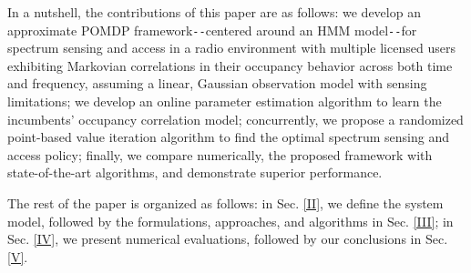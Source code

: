 \documentclass[10pt,twocolumn]{IEEEtran}
\begin{document}
 In a nutshell, the contributions of this paper are as follows:
we develop an approximate POMDP framework\texttt{-{}-}centered around an HMM model\texttt{-{}-}for spectrum sensing and access in a radio environment with multiple licensed users exhibiting Markovian correlations in their occupancy behavior across both time and frequency, assuming a linear, Gaussian observation model with sensing limitations; we develop an online parameter estimation algorithm to learn the incumbents' occupancy correlation model; concurrently, we propose a randomized point-based value iteration algorithm to find the optimal spectrum sensing and access policy; finally, we compare numerically, the proposed framework with state-of-the-art algorithms, and demonstrate superior performance. 

The rest of the paper is organized as follows: in Sec. \ref{II}, we define the system model, followed by the formulations, approaches, and algorithms in Sec. \ref{III}; in Sec. \ref{IV}, we present numerical evaluations, followed by our conclusions in Sec. \ref{V}.
\end{document}

